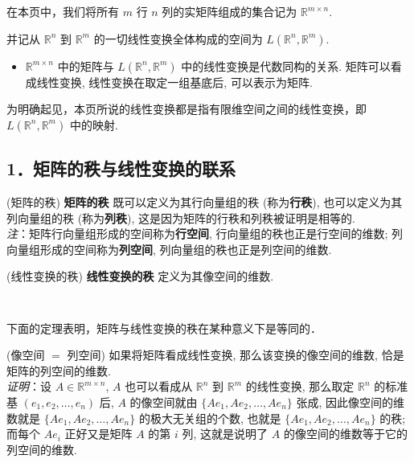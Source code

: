 
在本页中，我们将所有 $m$ 行 $n$ 列的实矩阵组成的集合记为 $\mathbb{R}^{m\times n}.$

并记从 $\mathbb{R}^{n}$ 到 $\mathbb{R}^{m}$ 的一切线性变换全体构成的空间为 $L(\mathbb{R}^{n},\mathbb{R}^{m}).$
\begin{itemize}
\item $\mathbb{R}^{m\times n}$ 中的矩阵与 $L(\mathbb{R}^{n},\mathbb{R}^{m})$
中的线性变换是代数同构的关系. 矩阵可以看成线性变换, 线性变换在取定一组基底后, 可以表示为矩阵. 
\end{itemize}

为明确起见，本页所说的线性变换都是指有限维空间之间的线性变换，即 $L(\mathbb{R}^{n},\mathbb{R}^{m})$ 中的映射.

\subsection{1．矩阵的秩与线性变换的联系}

\begin{definition}{(矩阵的秩)}
\textbf{矩阵的秩} 既可以定义为其行向量组的秩 (称为\textbf{行秩}), 也可以定义为其列向量组的秩 (称为\textbf{列秩}),
这是因为矩阵的行秩和列秩被证明是相等的. \\

\textsl{注}：矩阵行向量组形成的空间称为\textbf{行空间}, 行向量组的秩也正是行空间的维数;
列向量组形成的空间称为\textbf{列空间}, 列向量组的秩也正是列空间的维数.
\end{definition}



\begin{definition}{(线性变换的秩)}
\textbf{线性变换的秩} 定义为其像空间的维数.
\end{definition} 
\verb| |

下面的定理表明，矩阵与线性变换的秩在某种意义下是等同的．
\begin{theorem}{(像空间 $=$ 列空间)}
 如果将矩阵看成线性变换, 那么该变换的像空间的维数, 恰是矩阵的列空间的维数.\\

\textsl{ 证明}：设 $A\in\mathbb{R}^{m\times n}$, $A$ 也可以看成从 $\mathbb{R}^{n}$ 到 $\mathbb{R}^{m}$
的线性变换, 那么取定 $\mathbb{R}^{n}$ 的标准基 $(e_{1},e_{2},\ldots,e_{n})$ 后,
$A$ 的像空间就由 $\{Ae_{1},Ae_{2},\ldots,Ae_{n}\}$ 张成, 因此像空间的维数就是 $\{Ae_{1},Ae_{2},\ldots,Ae_{n}\}$
的极大无关组的个数, 也就是 $\{Ae_{1},Ae_{2},\ldots,Ae_{n}\}$ 的秩; 而每个 $Ae_{i}$
正好又是矩阵 $A$ 的第 $i$ 列, 这就是说明了 $A$ 的像空间的维数等于它的列空间的维数. 
\end{theorem}

